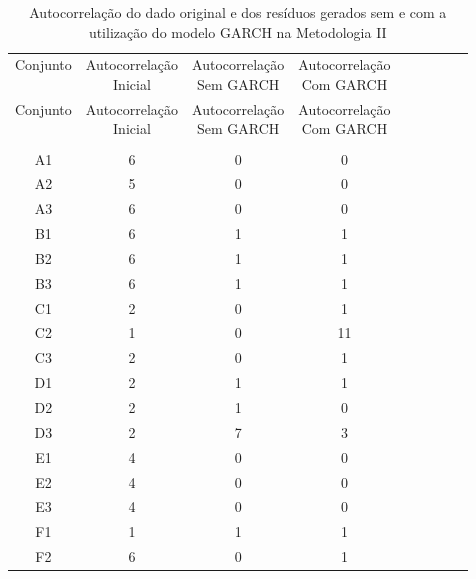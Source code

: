 \begin{center}
\begin{longtable}{ccccc|cccc}
\toprule
\rowcolor{white}
\caption[Metodologia II: evolução da autocorrelação]{Autocorrelação do dado
original e dos resíduos gerados sem e com a utilização do modelo GARCH na
Metodologia II} \label{tab:EvolucaoAutocorrelacaoMet2}\\
\midrule
Conjunto & \specialcell{Autocorrelação\\Inicial} & \specialcell{Autocorrelação\\Sem
GARCH} & \specialcell{Autocorrelação\\Com GARCH} \\
\midrule
\endfirsthead 
\midrule
\rowcolor{white}
Conjunto & \specialcell{Autocorrelação\\Inicial} & \specialcell{Autocorrelação\\Sem
GARCH} & \specialcell{Autocorrelação\\Com GARCH} \\
\toprule
\endhead
\midrule \\ %
\endfoot
\bottomrule 
\endlastfoot
    A1    & 6     & 0     & 0 \\
    A2    & 5     & 0     & 0 \\
    A3    & 6     & 0     & 0 \\
    B1    & 6     & 1     & 1 \\
    B2    & 6     & 1     & 1 \\
    B3    & 6     & 1     & 1 \\
    C1    & 2     & 0     & 1 \\
    C2    & 1     & 0     & 11 \\
    C3    & 2     & 0     & 1 \\
    D1    & 2     & 1     & 1 \\
    D2    & 2     & 1     & 0 \\
    D3    & 2     & 7     & 3 \\
    E1    & 4     & 0     & 0 \\
    E2    & 4     & 0     & 0 \\
    E3    & 4     & 0     & 0 \\
    F1    & 1     & 1     & 1 \\
    F2    & 6     & 0     & 1 \\

\end{longtable}
\end{center}
